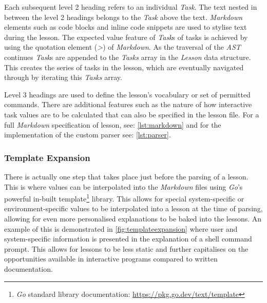 Each subsequent level 2 heading refers to an individual \textit{Task}. The text
nested in between the level 2 headings belongs to the \textit{Task} above the text.
\textit{Markdown} elements such as code blocks and inline code snippets are
used to stylise text during the lesson. The expected value feature of
\textit{Task}s of tasks is achieved by using the quotation element (\textit{>})
of \textit{Markdown}. As the traversal of the \textit{AST} continues
\textit{Task}s are appended to the \textit{Tasks} array in the \textit{Lesson}
data structure. This creates the series of tasks in the lesson, which are
eventually navigated through by iterating this \textit{Tasks} array. 

Level 3 headings are used to define the lesson's vocabulary or set of
permitted commands. There are additional features such as the nature of how
interactive task values are to be calculated that can also be specified in the
lesson file. For a full \textit{Markdown} specification of lesson, see:
\autoref{lst:markdown} and for the implementation of the custom parser see: \autoref{lst:parser}. 

\subsubsection{Template Expansion}

There is actually one step that takes place just before the parsing of a
lesson. This is where values can be interpolated into the \textit{Markdown}
files using \textit{Go}'s powerful in-built template\footnote{\textit{Go}
    standard library documentation: \url{https://pkg.go.dev/text/template}}
    library. This allows for special system-specific or environment-specific
    values to be interpolated into a lesson at the time of parsing, allowing
    for even more personalised explanations to be baked into the lessons. An
    example of this is demonstrated in \autoref{fig:templateexpansion} where
    user and system-specific information is presented in the explanation of a
    shell command prompt. This allows for lessons to be less static and further
    capitalises on the opportunities available in interactive programs compared
    to written documentation.

